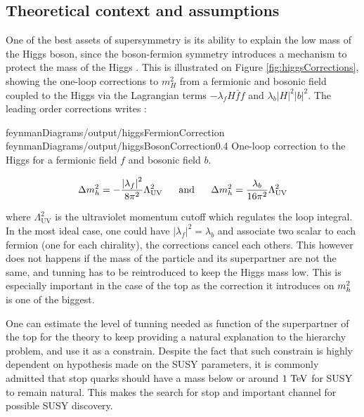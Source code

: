         \subsection{Theoretical context and assumptions}


        One of the best assets of supersymmetry is its ability to explain the low mass
        of the Higgs boson, since the boson-fermion symmetry introduces a mechanism to
        protect the mass of the Higgs . This is illustrated on Figure
        \ref{fig:higgsCorrections}, showing the one-loop corrections to $m_H^2$
        from a fermionic and bosonic field coupled to the Higgs via the Lagrangian terms
        $- \lambda_f H \bar{f} f$ and $\lambda_b \left| H \right|^2 \left| b \right|^2$.
        The leading order corrections writes :

        {feynmanDiagrams/output/higgsFermionCorrection}
        {feynmanDiagrams/output/higgsBosonCorrection}{0.4}
        {One-loop correction to the Higgs for a fermionic field $f$ and bosonic field $b$.}

        \begin{equation}
            \Delta m_{h}^2 = - \frac{\left| \lambda_f \right|^2}{8\pi^2} \Lambda^2_{\text{UV}}
            \, \, \, \, \, \, \, \, \, \, \text{and} \, \, \, \, \, \, \, \, \, \,
            \Delta m_{h}^2 =   \frac{\lambda_b}{16\pi^2} \Lambda^2_{\text{UV}}
        \end{equation}

        where $\Lambda^2_{\text{UV}}$ is the ultraviolet momentum cutoff which regulates
        the loop integral. In the most ideal case, one could have $\left| \lambda_f \right|^2
        = \lambda_b$ and associate two scalar to each fermion (one for each chirality),
        the corrections cancel each others. 
        This however does not happens if the mass of the particle and its superpartner
        are not the same, and tunning has to be reintroduced to keep the Higgs mass low.
        This is especially important in the case of the top as the correction it introduces
        on $m_{h}^2$ is one of the biggest.

        One can estimate the level of tunning needed as function of the superpartner of
        the top for the theory to keep providing a natural explanation to the hierarchy
        problem, and use it as a constrain. Despite the fact that such constrain is
        highly dependent on hypothesis made on the SUSY parameters, it is commonly admitted
        that stop quarks should have a mass below or around $1~\text{TeV}$ for SUSY to remain natural.
        This makes the search for stop and important channel for possible SUSY discovery.

